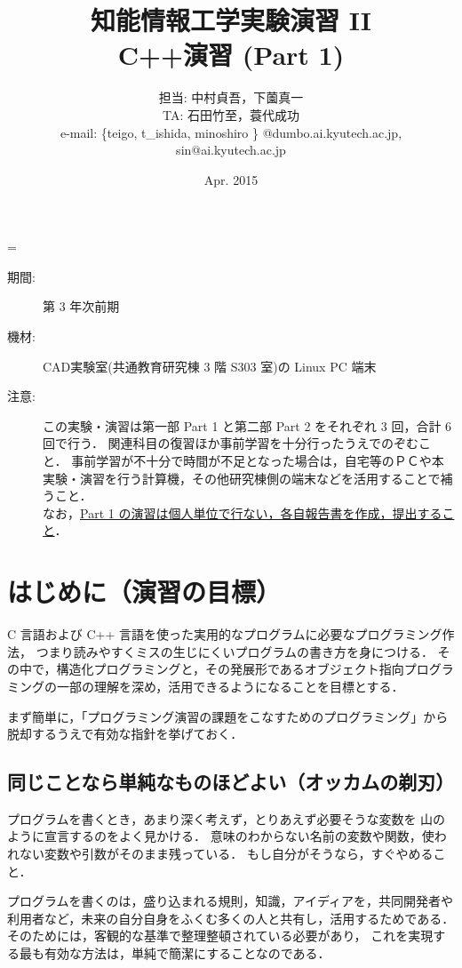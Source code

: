 \documentclass[11pt,a4,epsf]{jarticle}
\title{{\normalsize 知能情報工学実験演習 II } \\
{\bf C++演習 (Part 1)}
}
\author{担当: 中村貞吾，下薗真一\\
TA: 石田竹至，蓑代成功\\
\small
e-mail: 
{\sf \{teigo,  t\_ishida, minoshiro \} @dumbo.ai.kyutech.ac.jp},\\
\small
{\sf sin@ai.kyutech.ac.jp}
}
\date{Apr. 2015}
\def\linesparpage#1{\baselineskip=\textheight\divide\baselineskip#1}
\begin{document}
\linesparpage{36}
\maketitle

\medskip

\begin{description}
\item[期間:] 第 3 年次前期
\item[機材:] CAD実験室(共通教育研究棟 3 階 S303 室)の Linux PC 端末%
\item[注意:] この実験・演習は第一部 Part 1 と第二部 Part 2 をそれぞれ 3 回，合計 6 回で行う．
関連科目の復習ほか事前学習を十分行ったうえでのぞむこと．
事前学習が不十分で時間が不足となった場合は，自宅等のＰＣや本実験・演習を行う計算機，その他研究棟側の端末などを活用することで補うこと．\\
なお，\underline{Part 1 の演習は個人単位で行ない，各自報告書を作成，提出すること}．
\end{description}

\medskip

\section{はじめに（演習の目標）}

C 言語および C++ 言語を使った実用的なプログラムに必要なプログラミング作法，
つまり読みやすくミスの生じにくいプログラムの書き方を身につける．
その中で，構造化プログラミングと，その発展形であるオブジェクト指向プログラミングの一部の理解を深め，活用できるようになることを目標とする．

まず簡単に，「プログラミング演習の課題をこなすためのプログラミング」から脱却するうえで有効な指針を挙げておく．

\subsection{同じことなら単純なものほどよい（オッカムの剃刃）}

プログラムを書くとき，あまり深く考えず，とりあえず必要そうな変数を
山のように宣言するのをよく見かける．
意味のわからない名前の変数や関数，使われない変数や引数がそのまま残っている．
もし自分がそうなら，すぐやめること．

プログラムを書くのは，盛り込まれる規則，知識，アイディアを，共同開発者や利用者など，未来の自分自身をふくむ多くの人と共有し，活用するためである．
そのためには，客観的な基準で整理整頓されている必要があり，
これを実現する最も有効な方法は，単純で簡潔にすることなのである．
\end{document}
